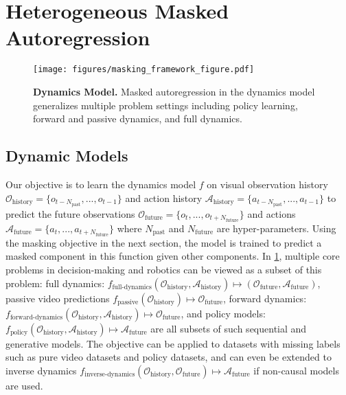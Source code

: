 \section{Heterogeneous Masked Autoregression}
\label{sec:method}
\begin{figure}
    \centering    \texttt{[image: figures/masking\_framework\_figure.pdf]}
    \caption{\textbf{Dynamics Model.} Masked autoregression in the dynamics model generalizes multiple problem settings including policy learning, forward and passive dynamics, and full dynamics. }
    \label{fig:dynamics}
\end{figure}

\subsection{Dynamic Models}
\label{subsec:dynamics}
Our objective is to learn the dynamics model $f$ on visual observation history $\mathcal{O}_{\text{history}}=\{o_{t-N_{\text{past}}},...,o_{t-1}\}$ and action history $\mathcal{A}_{\text{history}}=\{a_{t-N_{\text{past}}},...,a_{t-1}\}$ to predict the future observations $\mathcal{O}_{\text{future}}=\{o_{t},...,o_{t+N_{\text{future}}}\}$  and actions $\mathcal{A}_{\text{future}}=\{a_{t},...,a_{t+N_{\text{future}}}\}$ where $N_{\text{past}}$ and $N_{\text{future}}$ are hyper-parameters. Using the masking objective in the next section, the model is trained to predict a masked component in this function given other components. In \cref{fig:dynamics}, multiple core problems in decision-making and robotics \cite{bertsekas1995neuro,murray2017mathematical} can be viewed as a subset of this problem: 
full dynamics: $f_{\text{full-dynamics}}  (\mathcal{O}_{\text{history}},\mathcal{A}_{\text{history}})\mapsto (\mathcal{O}_{\text{future}},\mathcal{A}_{\text{future}})$, passive video predictions $f_{\text{passive}}  (\mathcal{O}_{\text{history}})\mapsto \mathcal{O}_{\text{future}}$, 
forward dynamics: $f_{\text{forward-dynamics}}(\mathcal{O}_{\text{history}},\mathcal{A}_{\text{history}})\mapsto \mathcal{O}_{\text{future}}$,  and policy models: $f_{\text{policy}}(\mathcal{O}_{\text{history}},\mathcal{A}_{\text{history}})\mapsto \mathcal{A}_{\text{future}}$ are all subsets of such sequential and generative models. The objective can be applied to datasets with missing labels such as pure video datasets and policy datasets, and can even be extended to inverse dynamics $f_{\text{inverse-dynamics}}  (\mathcal{O}_{\text{history}},\mathcal{O}_{\text{future}})\mapsto \mathcal{A}_{\text{future}}$ if non-causal models are used. 
 

